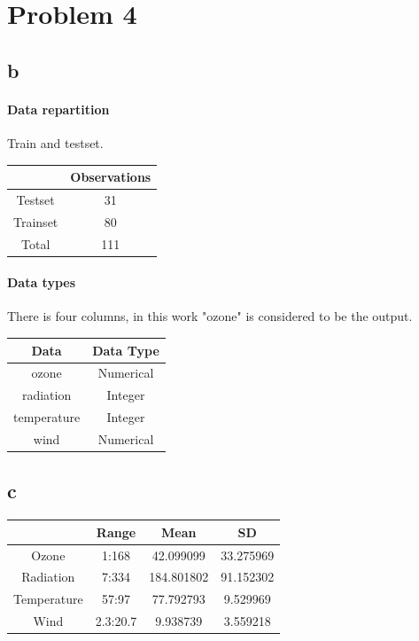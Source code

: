 \documentclass[11pt,a4paper,twoside,openright]{report}
\begin{document}
	
	
	\section*{Problem 4}
	\subsection*{b}
	
	\paragraph{Data repartition} Train and testset.\\
	
	
	\begin{table}[H]
		\centering
		\begin{tabular}{|c|c|}
			\hline 
			& \textbf{Observations} \\ 
			\hline 
			Testset & 31 \\ 
			\hline 
			Trainset & 80 \\ 
			\hline 
			Total & 111 \\ 
			\hline 
		\end{tabular} 
	\end{table}


\paragraph{Data types}  There is four columns, in this work "ozone" is considered to be the output.\\

	\begin{table}[H]
		\centering
		\begin{tabular}{|c|c|}
			\hline 
			\textbf{Data} & \textbf{Data Type}\\ 
			\hline 
			ozone & Numerical \\ 
			\hline 
			radiation & Integer \\ 
			\hline 
			temperature & Integer \\ 
			\hline 
			wind & Numerical \\ 
			\hline 
		\end{tabular} 
	\end{table}
	
	
	\subsection*{c}
	
	 
	\begin{table}[H]
		\centering
		\begin{tabular}{|c|c|c|c|}
			\hline 
			& Range & Mean & SD \\ 
			\hline 
			Ozone & 1:168 & 42.099099 & 33.275969 \\ 
			\hline 
			Radiation & 7:334 & 184.801802 & 91.152302 \\ 
			\hline 
			Temperature & 57:97 & 77.792793 & 9.529969 \\ 
			\hline 
			Wind & 2.3:20.7 & 9.938739 & 3.559218 \\ 
			\hline 
		\end{tabular} 
	\end{table}
	
\end{document}
